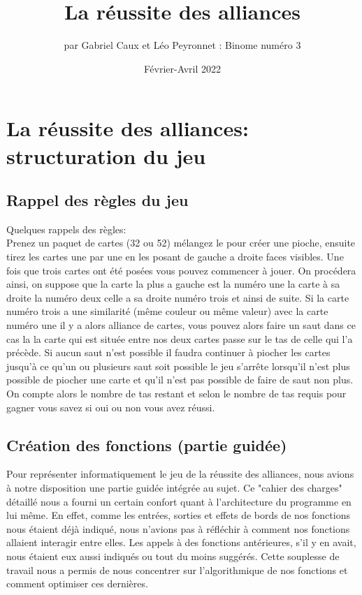 \documentclass[10pt,a4paper,french,titlepage]{article}
\author{par Gabriel Caux et Léo Peyronnet : Binome numéro 3}
\title{La réussite des alliances}
\date{Février-Avril 2022}
\theoremstyle{definition}
\begin{document}
\maketitle
\tableofcontents
\section{La réussite des alliances: structuration du jeu}
\subsection{Rappel des règles du jeu}
Quelques rappels des règles:\\
Prenez un paquet de cartes (32 ou 52) mélangez le pour créer une pioche, ensuite tirez les cartes une par une en les posant de gauche a droite faces visibles. Une fois que trois cartes ont été posées vous pouvez commencer à jouer. On procédera ainsi, on suppose que la carte la plus a gauche est la numéro une la carte à sa droite la numéro deux celle a sa droite numéro trois et ainsi de suite. Si la carte numéro trois a une similarité (même couleur ou même valeur) avec la carte numéro une il y a alors alliance de cartes, vous pouvez alors faire un saut dans ce cas la la carte qui est située entre nos deux cartes passe sur le tas de celle qui l'a précède. Si aucun saut n'est possible il faudra continuer à piocher les cartes jusqu'à ce qu'un ou plusieurs saut soit possible le jeu s'arrête lorsqu'il n'est plus possible de piocher une carte et qu'il n'est pas possible de faire de saut non plus. On compte alors le nombre de tas restant et selon le nombre de tas requis pour gagner vous savez si oui ou non vous avez réussi.

\subsection{Création des fonctions (partie guidée)}
Pour représenter informatiquement le jeu de la réussite des alliances, nous avions à notre disposition une partie guidée intégrée au sujet. Ce "cahier des charges" détaillé nous a fourni un certain confort quant à l'architecture du programme en lui même. En effet, comme les entrées, sorties et effets de bords de nos fonctions nous étaient déjà indiqué, nous n'avions pas à réfléchir à comment nos fonctions allaient interagir entre elles. Les appels à des fonctions antérieures, s'il y en avait, nous étaient eux aussi indiqués ou tout du moins suggérés. Cette souplesse de travail nous a permis de nous concentrer sur l'algorithmique de nos fonctions et comment optimiser ces dernières.\\
\end{document}
